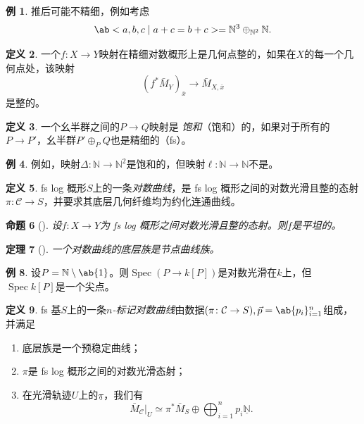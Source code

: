 \documentclass{amsart}
\newtheorem{thm}{定理}[section]
\newtheorem{prop}[thm]{命题}
\theoremstyle{definition}
\newtheorem{defn}[thm]{定义}
\newtheorem{exm}[thm]{例}
\theoremstyle{remark}
\theoremstyle{plain}
\theoremstyle{definition}
\theoremstyle{remark}
\newcommand{\N}{\mathbb{N}}
\newcommand{\mc}[1]{\mathcal{#1}}
\newcommand{\ul}[1]{\underline{#1}}
\newcommand{\1}{\mathbf{1}}
\newcommand{\2}{\mathbf{2}}
\newcommand{\3}{\mathbf{3}}
\DeclareMathOperator{\Spec}{Spec}
\begin{document}
\begin{exm}
推后可能不精细，例如考虑
    \[ \ab< a ,b,c \mid a+c=b+c> = \N^3 \oplus_{\N^2} \N. \]
\end{exm}

\begin{defn}
    一个\(f \colon X \to Y\)映射在精细对数概形上是几何点整的，如果在\(X\)的每一个几何点处，该映射
    \[ (f^*\bar{M}_Y)_{\bar{x}} \to \bar{M}_{X,\bar{x}} \]
是整的。
\end{defn}

\begin{defn}
    一个幺半群之间的\(P \to Q\)映射是 \textit{饱和}（饱和）的，如果对于所有的\(P \to P'\)，幺半群\(P' \oplus_P Q\)也是精细的（fs）。
\end{defn}

\begin{exm}
例如，映射\(\Delta \colon \N \to \N^2\)是饱和的，但映射\(\ell \colon \N \to \N\)不是。
\end{exm}

\begin{defn}
    fs log 概形\(S\)上的一条\textit{对数曲线}，是 fs log 概形之间的对数光滑且整的态射\(\pi \colon \mc{C} \to S\)，并要求其底层几何纤维均为约化连通曲线。
\end{defn}

\begin{prop}[{\cite{Kato1989}}]
    设\(f \colon X \to Y\)为 fs log 概形之间对数光滑且整的态射。则\(\ul{f}\)是平坦的。
\end{prop}

\begin{thm}[{\cite{FKato2000}}]
一个对数曲线的底层族是节点曲线族。
\end{thm}

\begin{exm}
设\(P = \N \setminus \ab\{1\}\)。则\(\Spec (P \to k[P])\)是对数光滑在\(k\)上，但\(\Spec k[P]\)是一个尖点。
\end{exm}

\begin{defn}
    fs 基\(S\)上的一条\textit{\(n\)-标记对数曲线}由数据\((\pi \colon \mc{C} \to S), \vec{p} = \ab\{p_i\}_{i=1}^n\)组成，并满足
    \begin{enumerate}
\item 底层族是一个预稳定曲线；
        \item \(\pi\)是 fs log 概形之间的对数光滑态射；
\item 在光滑轨迹\(U\)上的\(\ul{\pi}\)，我们有
            \[ \bar{M}_{\mc{C}}|_U \simeq \pi^* \bar{M}_S \oplus \bigoplus_{i=1}^n p_i \ul{\N}. \]
    \end{enumerate}
\end{defn}
\end{document}
